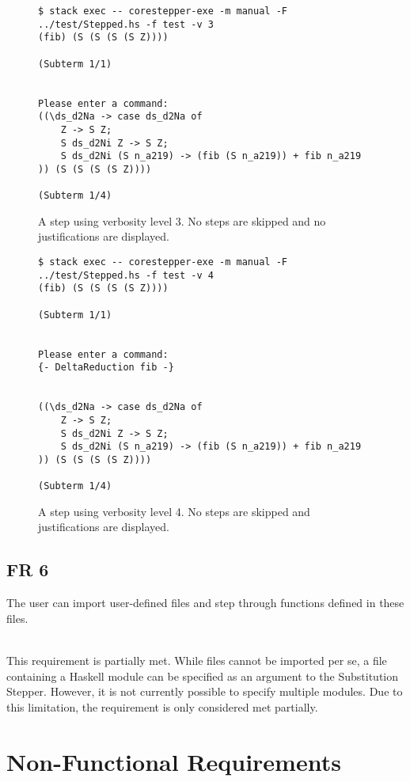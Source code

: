 \begin{figure}[!ht]
\begin{verbatim}
$ stack exec -- corestepper-exe -m manual -F ../test/Stepped.hs -f test -v 3
(fib) (S (S (S (S Z))))

(Subterm 1/1)


Please enter a command:
((\ds_d2Na -> case ds_d2Na of
    Z -> S Z;
    S ds_d2Ni Z -> S Z;
    S ds_d2Ni (S n_a219) -> (fib (S n_a219)) + fib n_a219
)) (S (S (S (S Z))))

(Subterm 1/4)
\end{verbatim}
    \caption{A step using verbosity level 3. No steps are skipped and no justifications are displayed.}
    \label{fig:FR5verbosit3}
\end{figure}

\begin{figure}[!ht]
\begin{verbatim}
$ stack exec -- corestepper-exe -m manual -F ../test/Stepped.hs -f test -v 4
(fib) (S (S (S (S Z))))

(Subterm 1/1)


Please enter a command:
{- DeltaReduction fib -}


((\ds_d2Na -> case ds_d2Na of
    Z -> S Z;
    S ds_d2Ni Z -> S Z;
    S ds_d2Ni (S n_a219) -> (fib (S n_a219)) + fib n_a219
)) (S (S (S (S Z))))

(Subterm 1/4)
\end{verbatim}
    \caption{A step using verbosity level 4. No steps are skipped and justifications are displayed.}
    \label{fig:FR5verbosit4}
\end{figure}


\clearpage
\subsection{FR 6}
The user can import user-defined files and step through functions defined in these files.

\ \\
This requirement is partially met.
While files cannot be imported per se, a file containing a Haskell module can be specified as an argument to the Substitution Stepper.
However, it is not currently possible to specify multiple modules.
Due to this limitation,
the requirement is only considered met partially.


\clearpage
\section{Non-Functional Requirements}


